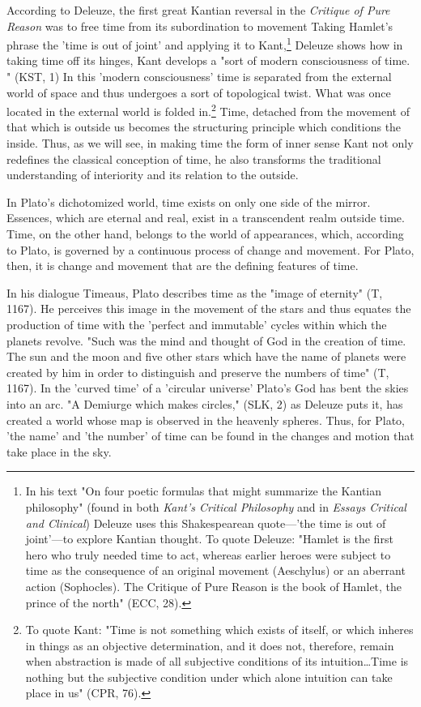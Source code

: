 According to Deleuze, the first great Kantian reversal in the \textit{Critique of Pure Reason} was to free time from its subordination to movement Taking Hamlet's phrase the 'time is out of joint' and applying it to Kant,\footnote{In his text "On four poetic formulas that might summarize the Kantian philosophy" (found in both \textit{Kant's Critical Philosophy} and in \textit{Essays Critical and Clinical}) Deleuze uses this Shakespearean quote---'the time is out of joint'---to explore Kantian thought. To quote Deleuze: "Hamlet is the first hero who truly needed time to act, whereas earlier heroes were subject to time as the consequence of an original movement (Aeschylus) or an aberrant action (Sophocles). The Critique of Pure Reason is the book of Hamlet, the prince of the north" (ECC, 28).} Deleuze shows how in taking time off its hinges, Kant develops a "sort of modern consciousness of time. " (KST, 1) In this 'modern consciousness' time is separated from the external world of space and thus undergoes a sort of  topological twist. What was once located in the external world is folded in.\footnote{To quote Kant: "Time is not something which exists of itself, or which inheres in things as an objective determination, and it does not, therefore, remain when abstraction is made of all subjective conditions of its intuition\dots Time is nothing but the subjective condition under which alone intuition can take place in us" (CPR, 76).} Time, detached from the movement of that which is outside us becomes the structuring principle which conditions the inside. Thus, as we will see, in making time the form of inner sense Kant not only redefines the classical conception of time, he also transforms the traditional understanding of interiority and its relation to the outside. 

In Plato's dichotomized world, time exists on only one side of the mirror. Essences, which are eternal and real, exist in a transcendent realm outside time. Time, on the other hand, belongs to the world of appearances, which, according to Plato, is governed by a continuous process of change and movement. For Plato, then, it is change and movement that are the defining features of time. 

In his dialogue Timeaus, Plato describes time as the "image of eternity" (T, 1167). He perceives this image in the movement of the stars and thus equates the production of time with the 'perfect and immutable' cycles within which the planets revolve. "Such was the mind and thought of God in the creation of time. The sun and the moon and five other stars which have the name of planets were created by him in order to distinguish and preserve the numbers of time" (T, 1167). In the 'curved time' of a 'circular universe' Plato's God has bent the skies into an arc. "A Demiurge which makes  circles," (SLK, 2) as Deleuze puts it, has created a world whose map is observed in the heavenly spheres. Thus, for Plato, 'the name' and 'the number' of time can be found in the changes and motion that take place in the sky. 

